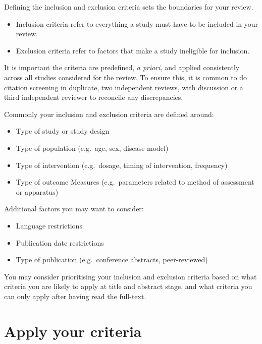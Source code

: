\documentclass[
]{book}
\providecommand{\tightlist}{%
  \setlength{\itemsep}{0pt}\setlength{\parskip}{0pt}}
\begin{document}
Defining the inclusion and exclusion criteria sets the boundaries for your review.

\begin{itemize}
\tightlist
\item
  Inclusion criteria refer to everything a study must have to be included in your review.
\item
  Exclusion criteria refer to factors that make a study ineligible for inclusion.
\end{itemize}

It is important the criteria are predefined, \emph{a priori}, and applied consistently across all studies considered for the review. To ensure this, it is common to do citation screening in duplicate, two independent reviews, with discussion or a third independent reviewer to reconcile any discrepancies.

Commonly your inclusion and exclusion criteria are defined around:

\begin{itemize}
\tightlist
\item
  Type of study or study design
\item
  Type of population (e.g.~age, sex, disease model)
\item
  Type of intervention (e.g.~dosage, timing of intervention, frequency)
\item
  Type of outcome Measures (e.g.~parameters related to method of assessment or apparatus)
\end{itemize}

Additional factors you may want to consider:

\begin{itemize}
\tightlist
\item
  Language restrictions
\item
  Publication date restrictions
\item
  Type of publication (e.g.~conference abstracts, peer-reviewed)
\end{itemize}

You may consider prioritising your inclusion and exclusion criteria based on what criteria you are likely to apply at title and abstract stage, and what criteria you can only apply after having read the full-text.

\section{Apply your criteria}\label{apply-your-criteria}
\end{document}
